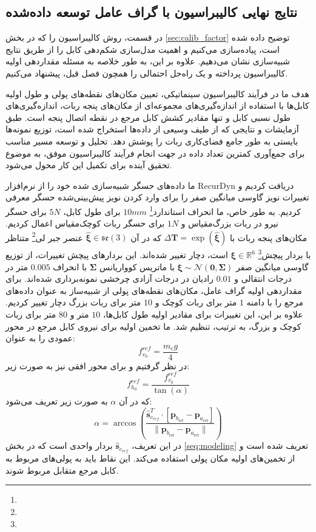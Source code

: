 \subsection{نتایج نهایی کالیبراسیون با گراف عامل توسعه‌ داده‌شده}
در قسمت، روش کالیبراسیون را که در بخش 
\ref{sec:calib_factor}
توضیح داده شده است، پیاده‌سازی می‌کنیم و اهمیت مدل‌سازی شکم‌دهی کابل را از طریق نتایج شبیه‌سازی نشان می‌دهیم. علاوه بر این، به طور خلاصه به مسئله مقداردهی اولیه کالیبراسیون پرداخته و یک راه‌حل احتمالی را همچون فصل قبل، پیشنهاد می‌کنیم.

هدف ما در فرآیند کالیبراسیون سینماتیکی، تعیین مکان‌های نقطه‌های پولی و طول اولیه کابل‌ها با استفاده از اندازه‌گیری‌های مجموعه‌ای از مکان‌های پنجه ربات، اندازه‌گیری‌های طول نسبی کابل و تنها مقادیر کشش کابل مرجع در نقطه اتصال پنجه است. طبق آزمایشات و نتایجی که از طیف وسیعی از داده‌ها استخراج شده است، توزیع نمونه‌ها بایستی به طور جامع فضای‌کاری ربات را پوشش دهد. تحلیل و توسعه مسیر مناسب برای جمع‌آوری کمترین تعداد داده در جهت انجام فرآیند کالیبراسیون موفق، به موضوع تحقیق آینده برای تکمیل این کار محول می‌شود.

ما داده‌های حسگر شبیه‌سازی شده خود را از نرم‌افزار RecurDyn دریافت کردیم و تغییرات نویز گاوسی میانگین صفر را برای وارد کردن نویز پیش‌بینی‌شده حسگر معرفی کردیم. به طور خاص، ما انحراف استاندارد\footnote{} 
$10mm$ 
برای طول کابل، $5N$ برای حسگر نیرو در ربات بزرگ‌مقیاس و $1N$ برای حسگر ربات کوچک‌مقیاس اعمال کردیم. مکان‌های پنجه ربات با $\Delta \mathbf{T} = \exp(\hat{\boldsymbol{\xi}})$ که در آن $\hat{\boldsymbol{\xi}} \in \mathfrak{se}(3)$ عنصر جبر لی\footnote{}
 متناظر با بردار پیچش\footnote{}
  $\boldsymbol{\xi} \in \mathbb{R}^6$
 است، دچار تغییر شده‌اند. این بردارهای پیچش تغییرات، از توزیع گاوسی میانگین صفر $\boldsymbol{\xi}\sim\mathcal{N}(\mathbf{0}, \boldsymbol{\Sigma})$ با ماتریس کوواریانس $\boldsymbol{\Sigma}$ با انحراف $0.005$ متر در درجات انتقالی و $0.01$ رادیان در درجات آزادی چرخشی نمونه‌برداری شده‌اند.
برای مقداردهی اولیه گراف عامل، مکان‌های نقطه‌های پولی از شبیه‌ساز به عنوان داده‌های مرجع را با دامنه $1$ متر برای ربات کوچک و $10$ متر برای  ربات بزرگ دچار تغییر کردیم. علاوه بر این، این تغییرات برای مقادیر اولیه طول کابل‌ها، $10$ متر و $80$ متر برای ربات کوچک و بزرگ، به ترتیب، تنظیم شد. ما تخمین اولیه برای نیروی کابل مرجع در محور عمودی را به عنوان:
\begin{equation}  \label{eq:fv_0}
	f^{{ref}}_{v_0} = \frac{m_eg}{4}
\end{equation}
  در نظر گرفتیم و برای محور افقی نیز به صورت زیر:
\begin{equation}  \label{eq:fh_0}
	f^{ref}_{h_0}=\frac{f^{{ref}}_{v_0}}{\tan(\alpha)} 
\end{equation}
که در آن $\alpha$ به صورت زیر تعریف می‌شود:
\begin{equation}  \label{eq:alpha}
	\alpha = \arccos\left(\frac{\hat{\bm{s}}_{c_{ref}}^T \cdot [\bm{p}_{b_{\text{ref}}} - \bm{p}_{a_{\text{ref}}}]}{\| \bm{p}_{b_{\text{ref}}} - \bm{p}_{a_{\text{ref}}} \|}\right)
\end{equation}
در این تعریف، $\hat{\bm{s}}_{c_{ref}}$ بردار واحدی است که در بخش \ref{seq:modeling} تعریف شده است و از تخمین‌های اولیه مکان پولی استفاده می‌کند. این نقاط باید به پولی‌های مربوط به کابل مرجع متقابل مربوط ‌شوند.

